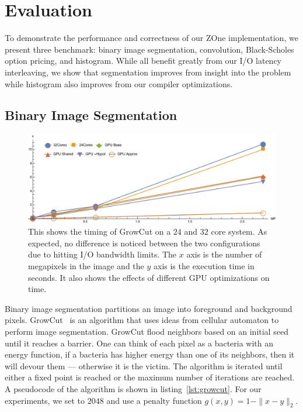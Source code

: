\section{Evaluation}

To demonstrate the performance and correctness of our ZOne implementation, we
present three benchmark: binary image segmentation, convolution, Black-Scholes
option pricing, and histogram.
While all benefit greatly from our I/O latency interleaving, we show
  that segmentation improves from insight into the problem while histogram also improves from our compiler optimizations.


\subsection{Binary Image Segmentation}

\begin{figure}
\centering
\includegraphics[scale=0.5]{fig/growcut.pdf}
\caption{This shows the timing of GrowCut on a $24$ and $32$ core system.
As expected, no difference is noticed between the two configurations due to hitting I/O
bandwidth limits. The $x$ axis is the number of megapixels in the image and the $y$ axis is the execution time in seconds. It also shows the effects of different GPU optimizations on time.}
\label{fig:growcut}
\centering
\end{figure}

Binary image segmentation partitions an image into foreground and background
  pixels.
GrowCut~\cite{vezhnevets2005growcut} is an algorithm that uses ideas from cellular automaton to perform image
  segmentation.
GrowCut flood
  neighbors based on an initial seed until it reaches a barrier.
One can think of each pixel as a bacteria with an energy function, if a bacteria has
  higher energy than one of its neighbors, then it will devour them --- otherwise it
  is the victim.
The algorithm is iterated until either a fixed point is reached or the maximum number
  of iterations are reached.
A pseudocode of the algorithm is shown in listing~\ref{lst:growcut}.
For our experiments, we set  to $2048$ and use a
  penalty function $g(x,y)  = 1 - \|x - y\|_2$.

